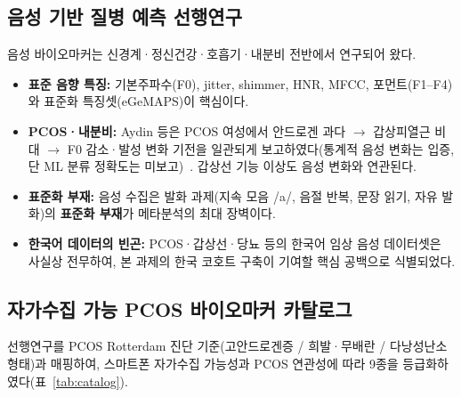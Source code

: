 \documentclass[11pt,a4paper]{article}
\begin{document}
\subsection{음성 기반 질병 예측 선행연구}
음성 바이오마커는 신경계·정신건강·호흡기·내분비 전반에서 연구되어 왔다.

\begin{itemize}
  \item \textbf{표준 음향 특징:} 기본주파수(F0), jitter, shimmer, HNR, MFCC, 포먼트(F1{--}F4)와 표준화 특징셋(eGeMAPS)이 핵심이다.
  \item \textbf{PCOS·내분비:} Aydin 등은 PCOS 여성에서 안드로겐 과다 $\rightarrow$ 갑상피열근 비대 $\rightarrow$ F0 감소·발성 변화 기전을 일관되게 보고하였다(통계적 음성 변화는 입증, 단 ML 분류 정확도는 미보고)~\cite{ref4}. 갑상선 기능 이상도 음성 변화와 연관된다.
  \item \textbf{표준화 부재:} 음성 수집은 발화 과제(지속 모음 /a/, 음절 반복, 문장 읽기, 자유 발화)의 \textbf{표준화 부재}가 메타분석의 최대 장벽이다.
  \item \textbf{한국어 데이터의 빈곤:} PCOS·갑상선·당뇨 등의 한국어 임상 음성 데이터셋은 사실상 전무하여, 본 과제의 한국 코호트 구축이 기여할 핵심 공백으로 식별되었다.
\end{itemize}

\subsection{자가수집 가능 PCOS 바이오마커 카탈로그}
선행연구를 PCOS Rotterdam 진단 기준(고안드로겐증 / 희발·무배란 / 다낭성난소 형태)과 매핑하여, 스마트폰 자가수집 가능성과 PCOS 연관성에 따라 9종을 등급화하였다(표~\ref{tab:catalog}).
\end{document}
